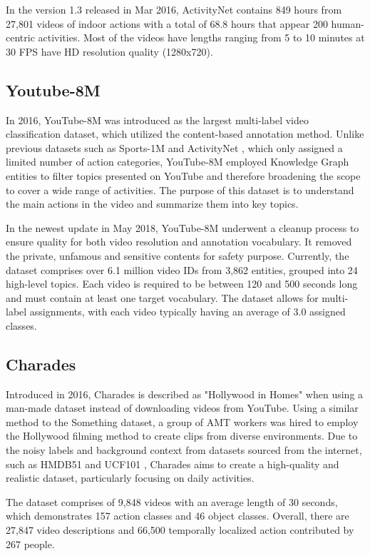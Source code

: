 \documentclass[a4paper]{article}
\begin{document}
In the version 1.3 released in Mar 2016, ActivityNet contains 849 hours from 27,801 videos of indoor actions with a total of 68.8 hours that appear 200 human-centric activities. Most of the videos have lengths ranging from 5 to 10 minutes at 30 FPS have HD resolution quality (1280x720). 
\subsection{Youtube-8M}
In 2016, YouTube-8M \cite{YouTube8M} was introduced as the largest multi-label video classification dataset, which utilized the content-based annotation method. Unlike previous datasets such as Sports-1M \cite{Sports1M} and ActivityNet \cite{ActivityNet}, which only assigned a limited number of action categories, YouTube-8M employed Knowledge Graph entities to filter topics presented on YouTube and therefore broadening the scope to cover a wide range of activities. The purpose of this dataset is to understand the main actions in the video and summarize them into key topics.

In the newest update in May 2018, YouTube-8M underwent a cleanup process to ensure quality for both video resolution and annotation vocabulary. It removed the private, unfamous and sensitive contents for safety purpose. Currently, the dataset comprises over 6.1 million video IDs from 3,862 entities, grouped into 24 high-level topics. Each video is required to be between 120 and 500 seconds long and must contain at least one target vocabulary. The dataset allows for multi-label assignments, with each video typically having an average of 3.0 assigned classes.

\subsection{Charades}
Introduced in 2016, Charades \cite{Charades} is described as "Hollywood in Homes" when using a man-made dataset instead of downloading videos from YouTube. Using a similar method to the Something \cite{Some} dataset, a group of AMT workers was hired to employ the Hollywood filming method to create clips from diverse environments. Due to the noisy labels and background context from datasets sourced from the internet, such as HMDB51 \cite{HMDB51} and UCF101 \cite{UCF101}, Charades aims to create a high-quality and realistic dataset, particularly focusing on daily activities.

The dataset comprises of 9,848 videos with an average length of 30 seconds, which demonstrates 157 action classes and 46 object classes. Overall, there are 27,847 video descriptions and 66,500 temporally localized action contributed by 267 people.
\end{document}
